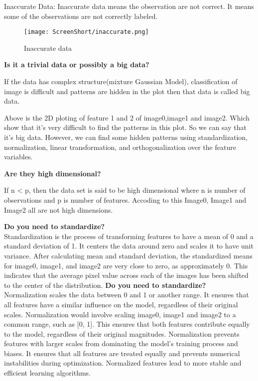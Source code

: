 \documentclass[conference,12pt]{IEEEtran}
\begin{document}
Inaccurate Data: Inaccurate data means the observation are not correct. It means some of the observations are not correctly labeled.
\begin{figure}[h!]
    \centering
    \texttt{[image: ScreenShort/inaccurate.png]}
    \caption{Inaccurate data}
\end{figure}

\textbf{Is it a trivial data or possibly a big data?}

If the data has complex structure(mixture Gaussian Model), classification of image is difficult and patterns are hidden in the plot then that data is called big data.

Above is the 2D ploting of feature 1 and 2 of image0,image1 and image2. Which show that it's very difficult to find the patterns in this plot. So we can say that it's big data. However, we can find some hidden patterns using standardization, normalization, linear transformation, and orthogonalization over the feature variables.

\textbf{Are they high dimensional?}

If n < p, then the data set is said to be high dimensional where n is number of observations and p is number of features. Accoding to this Image0, Image1 and Image2 all are not high dimensions.

\textbf{Do you need to standardize?}\\
Standardization is the process of transforming features to have a mean of 0 and a standard deviation of 1. It centers the data around zero and scales it to have unit variance. After calculating mean and standard deviation, the standardized means for image0, image1, and image2 are very close to zero, as approximately 0.
This indicates that the average pixel value across each of the images has been shifted to the center of the distribution.
\textbf{Do you need to standardize?}\\
Normalization scales the data between 0 and 1 or another range. It ensures that all features have a similar influence on the model, regardless of their original scales.
Normalization would involve scaling image0, image1 and image2 to a common range, such as [0, 1]. This ensures that both features contribute equally to the model, regardless of their original magnitudes.
Normalization prevents features with larger scales from dominating the model's training process and biases. It ensures that all features are treated equally and prevents numerical instabilities during optimization. Normalized features lead to more stable and efficient learning algorithms.
\end{document}
